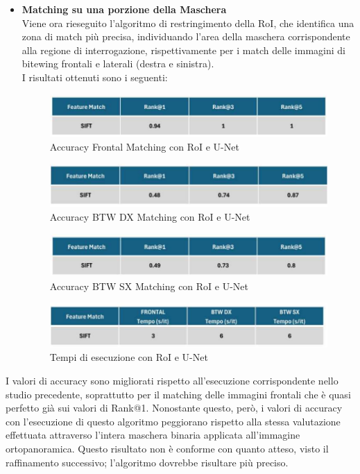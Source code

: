 \documentclass[12pt,a4paper,openright,twoside]{book}
\begin{document}
\begin{itemize}
\item \textbf{Matching su una porzione della Maschera}\\
Viene ora rieseguito l'algoritmo di restringimento della RoI, che identifica una zona di match più precisa, individuando l'area della maschera corrispondente alla regione di interrogazione, rispettivamente per i match delle immagini di bitewing frontali e laterali (destra e sinistra).\\
I risultati ottenuti sono i seguenti:
\begin{figure}[H]
	\centering
	\includegraphics{figures/frontal5.pdf}
   	\caption{Accuracy Frontal Matching con RoI e U-Net}
	\label{fig:frontal5}
\end{figure}
\begin{figure}[H]
	\centering
	\includegraphics{figures/dx5.pdf}
    	\caption{Accuracy BTW DX Matching con RoI e U-Net}
	\label{fig:dx5}
\end{figure}
\begin{figure}[H]
	\centering
	\includegraphics{figures/sx5.pdf}
    	\caption{Accuracy BTW SX Matching con RoI e U-Net}
	\label{fig:sx5}
\end{figure}
\begin{figure}[H]
	\centering
	\includegraphics{figures/tempi5.pdf}
    	\caption{Tempi di esecuzione con RoI e U-Net}
	\label{fig:tempi5}
\end{figure}
\end{itemize}
I valori di accuracy sono migliorati rispetto all'esecuzione corrispondente nello studio precedente, soprattutto per il matching delle immagini frontali che è quasi perfetto già sui valori di Rank@1. Nonostante questo, però, i valori di accuracy con l'esecuzione di questo algoritmo peggiorano rispetto alla stessa valutazione effettuata attraverso l'intera maschera binaria applicata all'immagine ortopanoramica. Questo risultato non è conforme con quanto atteso, visto il raffinamento successivo; l'algoritmo dovrebbe risultare più preciso.
\end{document}
